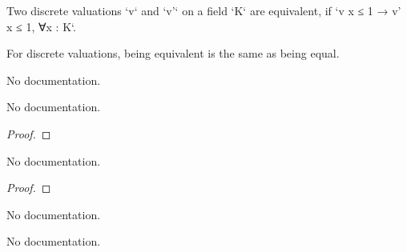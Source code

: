 \begin{theorem}\label{isEquiv_of_le_one_le_one}
                Two discrete valuations `v` and `v'` on a field `K` are equivalent, if `v x ≤ 1 → v' x ≤ 1, ∀x : K`.
    \end{theorem}

\begin{theorem}\label{isEquiv_iff_eq}
                For discrete valuations, being equivalent is the same as being equal.
    \end{theorem}

\begin{definition}\label{Valuation.Nontrivial}
        \leanok
                No documentation.
    \end{definition}

\begin{theorem}\label{Valuation.nontrivial_def}
        \leanok
                No documentation.
    \end{theorem}

\begin{proof}
    \leanok
\end{proof}

\begin{theorem}\label{DiscreteValuation.valuationSubring_DVR_of_equiv_discrete}
        \leanok
                No documentation.
    \end{theorem}

\begin{proof}
    \leanok
\end{proof}

\begin{definition}\label{DiscreteValuation.ofNontrivial}
                No documentation.
    \end{definition}

\begin{theorem}\label{DiscreteValuation.isEquiv_ofNontrivial}
                No documentation.
    \end{theorem}

